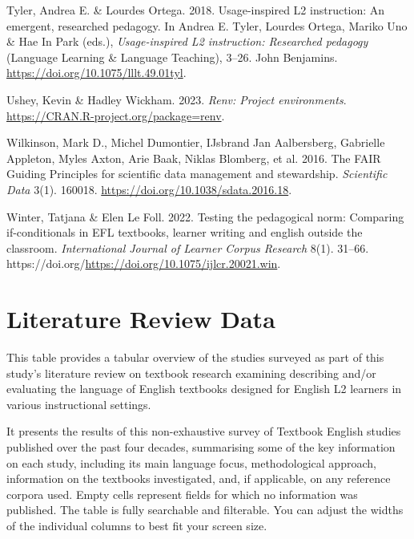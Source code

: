 \documentclass[
  letterpaper,
  DIV=11,
  numbers=noendperiod]{scrreprt}
\newlength{\cslhangindent}
\newenvironment{CSLReferences}[2] %
 {\begin{list}{}{%
  \setlength{\itemindent}{0pt}
  \setlength{\leftmargin}{0pt}
  \setlength{\parsep}{0pt}
  \ifodd #1
   \setlength{\leftmargin}{\cslhangindent}
   \setlength{\itemindent}{-1\cslhangindent}
  \fi
  \setlength{\itemsep}{#2\baselineskip}}}
 {\end{list}}
\begin{document}
\begin{CSLReferences}{1}{0}
Tyler, Andrea E. \& Lourdes Ortega. 2018. Usage-inspired L2 instruction:
An emergent, researched pedagogy. In Andrea E. Tyler, Lourdes Ortega,
Mariko Uno \& Hae In Park (eds.), \emph{Usage-inspired L2 instruction:
Researched pedagogy} (Language Learning \& Language Teaching), 3--26.
John Benjamins. \url{https://doi.org/10.1075/lllt.49.01tyl}.

Ushey, Kevin \& Hadley Wickham. 2023. \emph{Renv: Project environments}.
\url{https://CRAN.R-project.org/package=renv}.

Wilkinson, Mark D., Michel Dumontier, IJsbrand Jan Aalbersberg,
Gabrielle Appleton, Myles Axton, Arie Baak, Niklas Blomberg, et al.
2016. The FAIR Guiding Principles for scientific data management and
stewardship. \emph{Scientific Data} 3(1). 160018.
\url{https://doi.org/10.1038/sdata.2016.18}.

Winter, Tatjana \& Elen Le Foll. 2022. Testing the pedagogical norm:
Comparing if-conditionals in EFL textbooks, learner writing and english
outside the classroom. \emph{International Journal of Learner Corpus
Research} 8(1). 31--66.
https://doi.org/\url{https://doi.org/10.1075/ijlcr.20021.win}.

\end{CSLReferences}

\cleardoublepage
{}
{}
\appendix

\chapter{Literature Review Data}\label{literature-review-data}

This table provides a tabular overview of the studies surveyed as part
of this study's literature review on textbook research examining
describing and/or evaluating the language of English textbooks designed
for English L2 learners in various instructional settings.

It presents the results of this non-exhaustive survey of Textbook
English studies published over the past four decades, summarising some
of the key information on each study, including its main language focus,
methodological approach, information on the textbooks investigated, and,
if applicable, on any reference corpora used. Empty cells represent
fields for which no information was published. The table is fully
searchable and filterable. You can adjust the widths of the individual
columns to best fit your screen size.
\end{document}
